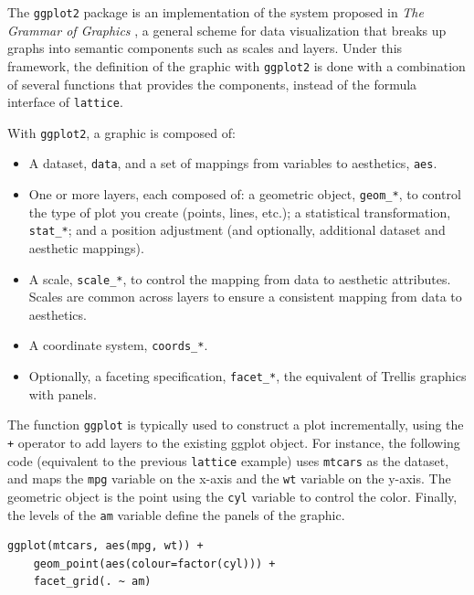 \documentclass[smallroyalvopaper]{memoir}
\begin{document}

The \texttt{ggplot2} package \cite{Wickham2009} is an implementation of the system proposed in \emph{The Grammar of Graphics} \cite{Wilkinson1999}, a general scheme for data visualization that breaks up graphs into semantic components such as scales and layers. Under this framework, the definition of the graphic with \texttt{ggplot2} is done with a combination of several functions that provides the components, instead of the formula interface of
\texttt{lattice}.

With \texttt{ggplot2}, a graphic is composed of:

\begin{itemize}
\item A dataset, \texttt{data}, and a set of mappings from variables to aesthetics, \texttt{aes}.
\item One or more layers, each composed of: a geometric object, \texttt{geom\_*}, to control the type of plot you create (points, lines, etc.); a statistical transformation, \texttt{stat\_*}; and a position adjustment (and optionally, additional dataset and aesthetic mappings).
\item A scale, \texttt{scale\_*}, to control the mapping from data to aesthetic attributes. Scales are common across layers to ensure a consistent mapping from data to aesthetics.
\item A coordinate system, \texttt{coords\_*}.
\item Optionally, a faceting specification, \texttt{facet\_*}, the equivalent of Trellis graphics with panels.
\end{itemize}

The function \texttt{ggplot} is typically used to construct a plot incrementally, using the \texttt{+} operator to add layers to the existing ggplot object.  For instance, the following code (equivalent to the previous \texttt{lattice} example) uses \texttt{mtcars} as the dataset, and maps the \texttt{mpg} variable on the x-axis and the \texttt{wt} variable on the y-axis. The geometric object is the point using the \texttt{cyl} variable to control the color. Finally, the levels of the \texttt{am} variable define the panels of the graphic. 

\lstset{language=r,label= ,caption= ,captionpos=b,numbers=none}
\begin{lstlisting}
ggplot(mtcars, aes(mpg, wt)) +
    geom_point(aes(colour=factor(cyl))) +
    facet_grid(. ~ am)
\end{lstlisting}
\end{document}
